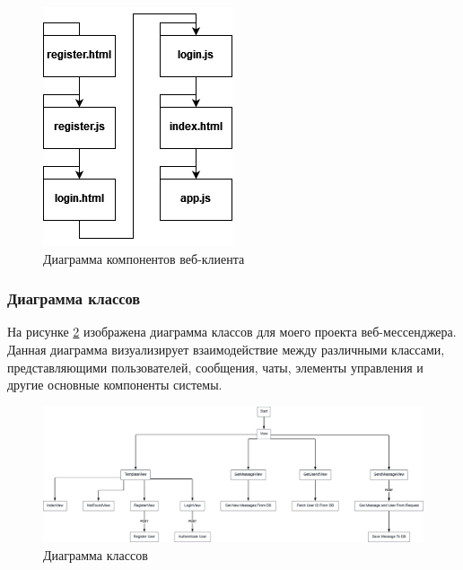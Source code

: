 \begin{figure}[H]
	\centering
	\includegraphics[width=0.7\linewidth]{images/klient_diag}
	\caption{Диаграмма компонентов веб-клиента}
	\label{fig:klientdiag}
\end{figure}

\subsubsection{Диаграмма классов}
На рисунке \ref{fig:classdiag} изображена диаграмма классов для моего проекта веб-мессенджера. Данная диаграмма визуализирует взаимодействие между различными классами, представляющими пользователей, сообщения, чаты, элементы управления и другие основные компоненты системы.


\begin{figure}
	\centering
	\includegraphics[width=0.7\linewidth]{images/class_diag}
	\caption{Диаграмма классов}
	\label{fig:classdiag}
\end{figure}


